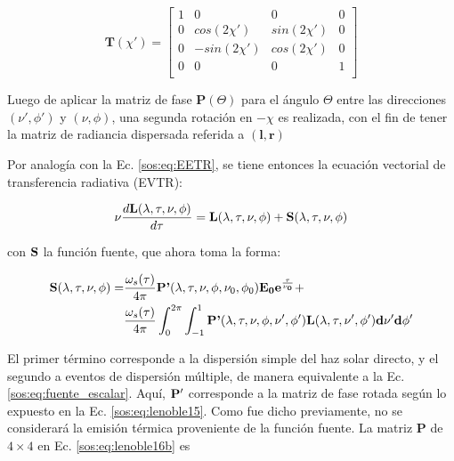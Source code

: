         \begin{equation}
         \textbf{T}(\chi')=
         \begin{bmatrix}
        {1} & {0} & {0} & {0}\\
        {0} & {cos(2\chi')} & {sin(2\chi')} & {0}\\
        {0} & {-sin(2\chi')} & {cos(2\chi')} & {0}\\
        {0} & {0} & {0} & {1}\\
          \end{bmatrix}
        \label{sos:eq:lenoble15}
        \end{equation}

        Luego de aplicar la matriz de fase $\textbf{P}(\Theta)$ para el ángulo $\Theta$ entre las direcciones $(\nu',\phi')$ y $(\nu,\phi)$, una segunda rotación en $-\chi$ es realizada, con el fin de tener la matriz de radiancia dispersada referida a $(\textbf{l},\textbf{r})$
        
        Por analogía con la Ec. \ref{sos:eq:EETR}, se tiene entonces la ecuación vectorial de transferencia radiativa (EVTR):

        \begin{equation}
        \nu \frac{d \bf{L}(\lambda,\tau,\nu,\phi)}{d 
        \tau}=\bf{L}(\lambda,\tau,\nu,\phi)+\bf{S}(\lambda,\tau,\nu,\phi)
        \label{sos:eq:lenoble16a}
        \end{equation}
        
        \noindent con $\bf{S}$ la función fuente, que ahora toma la forma:
        
        \begin{align}
        \begin{split}
        \textbf{S}(\lambda,\tau,\nu,\phi) =&\frac{\omega_{s}(\tau)}{4 \pi} 
        \textbf{P'}(\lambda,\tau,\nu,\phi,\nu_{0},\phi_{0})  \bf{E}_{0} e^{\frac{\tau}{\nu_0}} 
        +\\ &\frac{\omega_{s}(\tau)}{4 \pi} \int_{0}^{2\pi} 
        \int_{-1}^{1} \textbf{P'}(\lambda,\tau,\nu,\phi,\nu',\phi') \bf{L}(\lambda,\tau,\nu',\phi')d\nu'd\phi'
        \label{sos:eq:lenoble16b}
        \end{split}
        \end{align}
        
        El primer término corresponde a la dispersión simple del haz solar directo, y el segundo a eventos de dispersión múltiple, de manera equivalente a la Ec. \ref{sos:eq:fuente_escalar}. Aquí, $\bf{P'}$ corresponde a la matriz de fase rotada según lo expuesto en la Ec. \ref{sos:eq:lenoble15}. Como fue dicho previamente, no se considerará la emisión térmica proveniente de la función fuente. La matriz $\textbf{P}$ de $4 \times 4$ en Ec. \ref{sos:eq:lenoble16b} es
        
